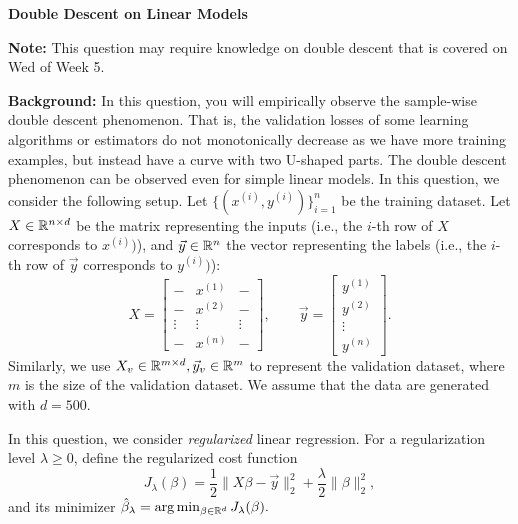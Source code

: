 \item {} {\bf Double Descent on Linear Models}

{\bf Note:} This question may require knowledge on double descent that is covered on Wed of Week 5. 

\textbf{Background: } 
In this question, you will empirically observe the sample-wise double descent phenomenon. That is, the validation losses of some learning algorithms or estimators do not monotonically decrease as we have more training examples, but instead have a curve with two U-shaped parts. The double descent phenomenon can be observed even for simple linear models. In this question, we consider the following setup. Let $\{(x^{(i)},y^{(i)})\}_{i=1}^{n}$ be the training dataset. Let $X\in\mathbb{R}^{n\times d}$ be the matrix representing the inputs (i.e., the $i$-th row of $X$ corresponds to $x^{(i)})$), and $\vec{y}\in\mathbb{R}^{n}$ the vector representing the labels (i.e., the $i$-th row of $\vec{y}$ corresponds to $y^{(i)})$):
$$
X=
\begin{bmatrix}
	- & x^{(1)} & - \\
	- & x^{(2)} & - \\
	\vdots & \vdots & \vdots\\
	- & x^{(n)} & - 
\end{bmatrix},\qquad
\vec{y}=
\begin{bmatrix}
	y^{(1)} \\
	y^{(2)}\\
	\vdots\\
	y^{(n)}
\end{bmatrix}.
$$
Similarly, we use $X_v\in \mathbb{R}^{m\times d}, \vec{y}_v\in \mathbb{R}^{m}$ to represent the validation dataset, where $m$ is the size of the validation dataset. We assume that the data are generated with $d=500$. 

In this question, we consider \emph{regularized} linear regression. For a regularization level $\lambda\ge 0$, define the regularized cost function $$J_\lambda(\beta)=\frac{1}{2}\|X\beta-\vec{y}\|_2^2+\frac{\lambda}{2}\|\beta\|_2^2,$$ and its minimizer $\hat{\beta}_\lambda=\arg\min_{\beta\in \mathbb{R}^{d}}J_\lambda(\beta).$

\begin{enumerate}
 	
	\ifnum{} {
	
} \fi


\ifnum{} {
	
} \fi

	
	\ifnum{} {
	
	} \fi

\end{enumerate}
